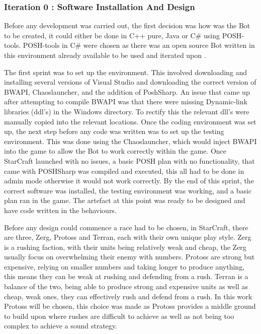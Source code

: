\documentclass[journal]{IEEEtran}
\begin{document}
	\subsubsection{Iteration 0 : Software Installation And Design}
	Before any development was carried out, the first decision was how was the Bot to be created, it could either be done in C++ pure, Java or C\# using POSH-tools. POSH-tools in C\# were chosen as there was an open source Bot written in this environment already available to be used and iterated upon \cite{Swen}.
	
	The first sprint was to set up the environment. This involved downloading and installing several versions of Visual Studio and downloading the correct version of BWAPI, Chaoslauncher, and the addition of PoshSharp. An issue that came up after attempting to compile BWAPI was that there were missing Dynamic-link libraries (ddl's) in the Windows directory. To rectify this the relevant dll's were manually copied into the relevant locations. Once the coding environment was set up, the next step before any code was written was to set up the testing environment. This was done using the Chaoslauncher, which would inject BWAPI into the game to allow the Bot to work correctly within the game. Once StarCraft launched with no issues, a basic POSH plan with no functionality, that came with POSHSharp was compiled and executed, this all had to be done in admin mode otherwise it would not work correctly. By the end of this sprint, the correct software was installed, the testing environment was working, and a basic plan ran in the game. The artefact at this point was ready to be designed and have code written in the behaviours.
	
	Before any design could commence a race had to be chosen, in StarCraft, there are three, Zerg, Protoss and Terran, each with their own unique play style. Zerg is a rushing faction, with their units being relatively weak and cheap, the Zerg usually focus on overwhelming their enemy with numbers. Protoss are strong but expensive, relying on smaller numbers and taking longer to produce anything, this means they can be weak at rushing and defending from a rush. Terran is a balance of the two, being able to produce strong and expensive units as well as cheap, weak ones, they can effectively rush and defend from a rush.    In this work Protoss will be chosen, this choice was made as Protoss provides a middle ground to build upon where rushes are difficult to achieve as well as not being too complex to achieve a sound strategy. 
	
\end{document}
